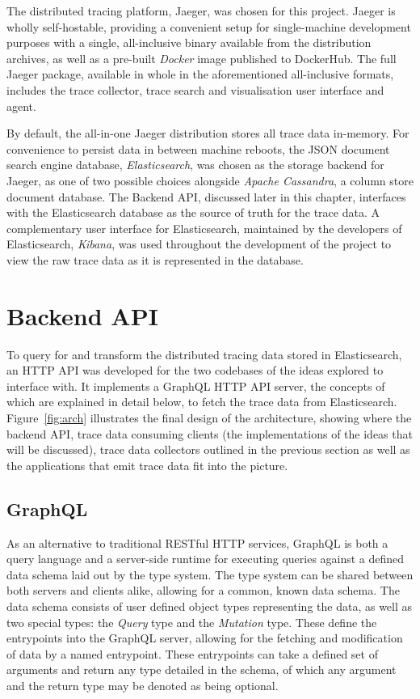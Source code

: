 \documentclass[12pt,pdftex,titlepage]{report}
\begin{document}
            The distributed tracing platform, Jaeger, was chosen for this project. Jaeger is wholly self-hostable, providing a convenient setup for single-machine development purposes with
            a single, all-inclusive binary available from the distribution archives, as well as a pre-built \textit{Docker} image published to DockerHub. The full Jaeger package,
            available in whole in the aforementioned all-inclusive formats, includes the trace collector, trace search and visualisation user interface and agent.

            By default, the all-in-one Jaeger distribution stores all trace data in-memory. For convenience to persist data in between machine reboots, the JSON document search engine
            database, \textit{Elasticsearch}, was chosen as the storage backend for Jaeger, as one of two possible choices alongside \textit{Apache Cassandra}, a column store document
            database. The Backend API, discussed later in this chapter, interfaces with the Elasticsearch database as the source of truth for the trace data. A complementary user interface
            for Elasticsearch, maintained by the developers of Elasticsearch, \textit{Kibana}, was used throughout the development of the project to view the raw trace data as it is 
            represented in the database.

        \section{Backend API}
            To query for and transform the distributed tracing data stored in Elasticsearch, an HTTP API was developed for the two codebases of the ideas explored to interface with.
            It implements a GraphQL HTTP API server, the concepts of which are explained in detail below, to fetch the trace data from Elasticsearch. Figure~\ref{fig:arch} illustrates
            the final design of the architecture, showing where the backend API, trace data consuming clients (the implementations of the ideas that will be discussed), trace data collectors
            outlined in the previous section as well as the applications that emit trace data fit into the picture.

            \subsection{GraphQL}
                As an alternative to traditional RESTful HTTP services, GraphQL is both a query language and a server-side runtime for executing queries against a defined data schema
                laid out by the type system. The type system can be shared between both servers and clients alike, allowing for a common, known data schema. The data schema consists of 
                user defined object types representing the data, as well as two special types: the \textit{Query} type and the \textit{Mutation} type. These define the entrypoints into
                the GraphQL server, allowing for the fetching and modification of data by a named entrypoint. These entrypoints can take a defined set of arguments and return any type
                detailed in the schema, of which any argument and the return type may be denoted as being optional.
\end{document}
